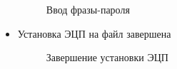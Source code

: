 \documentclass[10pt,a4paper]{report}
\begin{document}
\begin{itemize}
\begin{figure}[h]	
\caption{Ввод фразы-пароля}
\label{ris:image7}
\end{figure}
\item Установка ЭЦП на файл завершена
\begin{figure}[h]	
\caption{Завершение установки ЭЦП}
\label{ris:image8}
\end{figure}
\end{itemize}
\end{document}
